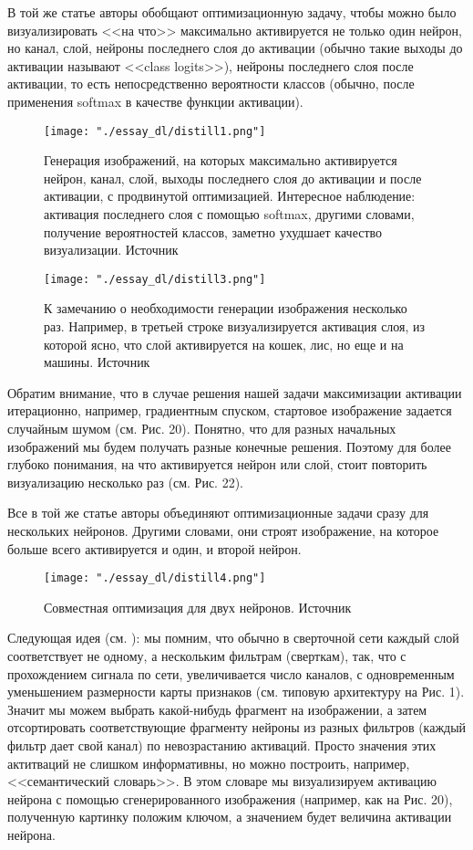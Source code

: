 \documentclass[12pt,fleqn]{article}
\begin{document}
В той же статье \cite{grad5} авторы обобщают оптимизационную задачу, чтобы можно было визуализировать <<на что>> максимально активируется не только один нейрон, но канал, слой, нейроны последнего слоя до активации (обычно такие выходы до активации называют <<class logits>>), нейроны последнего слоя после активации, то есть непосредственно вероятности классов (обычно, после применения softmax в качестве функции активации).
\begin{figure}[H]
\centering
\texttt{[image: "./essay\_dl/distill1.png"]}
\caption{Генерация изображений, на которых максимально активируется нейрон, канал, слой, выходы последнего слоя до активации и после активации, с продвинутой оптимизацией. Интересное наблюдение: активация последнего слоя с помощью softmax, другими словами, получение вероятностей классов, заметно ухудшает качество визуализации. Источник \cite{grad5}}
\end{figure}

\begin{figure}[H]
\centering
\texttt{[image: "./essay\_dl/distill3.png"]}
\caption{К замечанию о необходимости генерации изображения несколько раз. Например, в третьей строке визуализируется активация слоя, из которой ясно, что слой активируется на кошек, лис, но еще и на машины. Источник \cite{grad5}}
\end{figure}
Обратим внимание, что в случае решения нашей задачи максимизации активации итерационно, например, градиентным спуском, стартовое изображение задается случайным шумом (см. Рис. 20). Понятно, что для разных начальных изображений мы будем получать разные конечные решения. Поэтому для более глубоко понимания, на что активируется нейрон или слой, стоит повторить визуализацию несколько раз (см. Рис. 22).

Все в той же статье \cite{grad5} авторы объединяют оптимизационные задачи сразу для нескольких нейронов. Другими словами, они строят изображение, на которое больше всего активируется и один, и второй нейрон.

\begin{figure}[H]
\centering
\texttt{[image: "./essay\_dl/distill4.png"]}
\caption{Совместная оптимизация для двух нейронов. Источник \cite{grad5}}
\end{figure}

Следующая идея (см. \cite{grad6}): мы помним, что обычно в сверточной сети каждый слой соответствует не одному, а нескольким фильтрам (сверткам), так, что с прохождением сигнала по сети, увеличивается число каналов, с одновременным уменьшением размерности карты признаков (см. типовую архитектуру на Рис. 1). Значит мы можем выбрать какой-нибудь фрагмент на изображении, а затем отсортировать соответствующие фрагменту нейроны из разных фильтров (каждый фильтр дает свой канал) по невозрастанию активаций. Просто значения этих актитваций не слишком информативны, но можно построить, например, <<семантический словарь>>. В этом словаре мы визуализируем активацию нейрона с помощью сгенерированного изображения (например, как на Рис. 20), полученную картинку положим ключом, а значением будет величина активации нейрона.  
\end{document}
